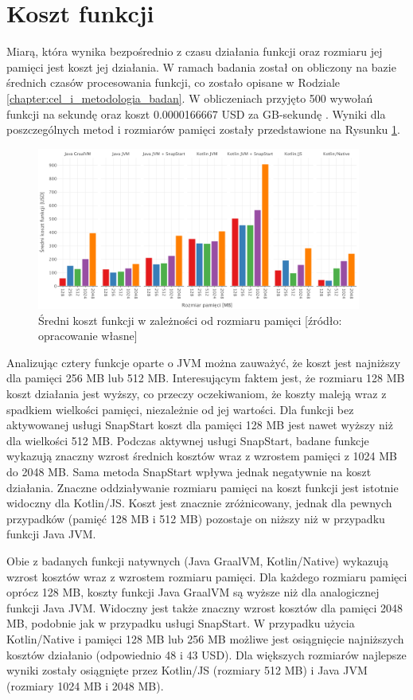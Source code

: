 \section{Koszt funkcji}\label{chapter:results_cost}

Miarą, która wynika bezpośrednio z czasu działania funkcji oraz rozmiaru jej pamięci jest koszt jej działania.
W ramach badania został on obliczony na bazie średnich czasów procesowania funkcji, co zostało opisane w Rodziale \ref{chapter:cel_i_metodologia_badan}.
W obliczeniach przyjęto 500 wywołań funkcji na sekundę oraz koszt 0.0000166667 USD za GB-sekundę \cite{awsLambdaPricing}.
Wyniki dla poszczególnych metod i rozmiarów pamięci zostały przedstawione na Rysunku \ref{fig:avg_costs}.

\begin{figure}[h]
    \centering
    \includegraphics[width=0.95\textwidth]{charts/results/average-cost.png}
    \caption{Średni koszt funkcji w zależności od rozmiaru pamięci [źródło: opracowanie własne]}
    \label{fig:avg_costs}
\end{figure}

Analizując cztery funkcje oparte o JVM można zauważyć, że koszt jest najniższy dla pamięci 256 MB lub 512 MB.
Interesującym faktem jest, że rozmiaru 128 MB koszt działania jest wyższy, co przeczy oczekiwaniom, że koszty maleją wraz z spadkiem wielkości pamięci, niezależnie od jej wartości.
Dla funkcji bez aktywowanej usługi SnapStart koszt dla pamięci 128 MB jest nawet wyższy niż dla wielkości 512 MB.
Podczas aktywnej usługi SnapStart, badane funkcje wykazują znaczny wzrost średnich kosztów wraz z wzrostem pamięci z 1024 MB do 2048 MB.
Sama metoda SnapStart wpływa jednak negatywnie na koszt działania.
Znaczne oddziaływanie rozmiaru pamięci na koszt funkcji jest istotnie widoczny dla Kotlin/JS.
Koszt jest znacznie zróżnicowany, jednak dla pewnych przypadków (pamięć 128 MB i 512 MB) pozostaje on niższy niż w przypadku funkcji Java JVM.

Obie z badanych funkcji natywnych (Java GraalVM, Kotlin/Native) wykazują wzrost kosztów wraz z wzrostem rozmiaru pamięci.
Dla każdego rozmiaru pamięci oprócz 128 MB, koszty funkcji Java GraalVM są wyższe niż dla analogicznej funkcji Java JVM.
Widoczny jest także znaczny wzrost kosztów dla pamięci 2048 MB, podobnie jak w przypadku usługi SnapStart.
W przypadku użycia Kotlin/Native i pamięci 128 MB lub 256 MB możliwe jest osiągnięcie najniższych kosztów działanio (odpowiednio 48 i 43 USD).
Dla większych rozmiarów najlepsze wyniki zostały osiągnięte przez Kotlin/JS (rozmiary 512 MB) i Java JVM (rozmiary 1024 MB i 2048 MB).
